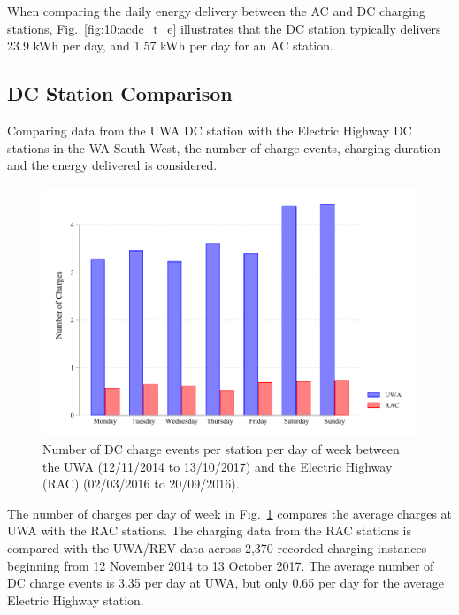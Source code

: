 When comparing the daily energy delivery between the AC and DC charging stations, Fig.~\ref{fig:10:acdc_t_e} illustrates that the DC station typically delivers 23.9 kWh per day, and 1.57 kWh per day for an AC station.

\subsection{DC Station Comparison}
\label{sec:10:dc}
Comparing data from the UWA DC station with the Electric Highway DC stations in the WA South-West, the number of charge events, charging duration and the energy delivered is considered.

\begin{figure}[H]
	\centering
	\includegraphics[width=0.8\linewidth]{uwarac_c}
	\caption[Number of DC charge events per station per day of week]{Number of DC charge events per station per day of week between the UWA (12/11/2014 to 13/10/2017) and the Electric Highway (RAC) (02/03/2016 to 20/09/2016).}
	\label{fig:10:uwarac_c}
\end{figure}

The number of charges per day of week in Fig.~\ref{fig:10:uwarac_c} compares the average charges at UWA with the RAC stations. The charging data from the RAC stations is compared with the UWA/REV data across 2,370 recorded charging instances beginning from 12 November 2014 to 13 October 2017. The average number of DC charge events is 3.35 per day at UWA, but only 0.65 per day for the average Electric Highway station. 

